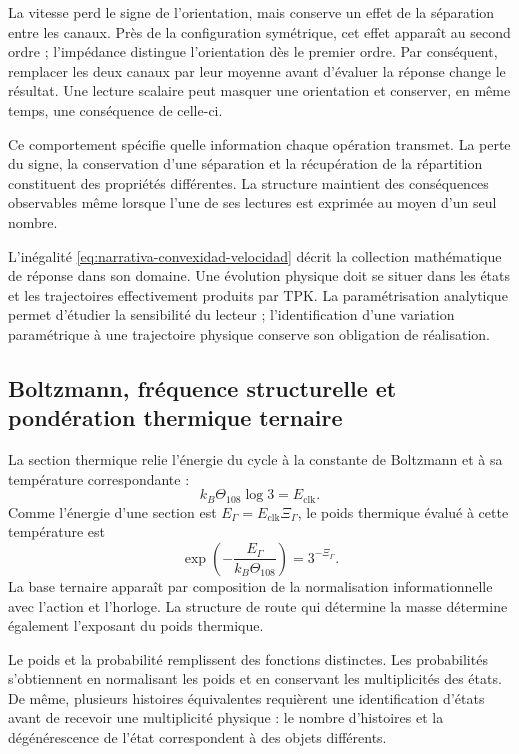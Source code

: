 La vitesse perd le signe de l’orientation, mais conserve un effet
de la séparation entre les canaux. Près de la configuration symétrique,
cet effet apparaît au second ordre ; l’impédance distingue l’orientation
dès le premier ordre. Par conséquent, remplacer les deux canaux par leur moyenne avant
d’évaluer la réponse change le résultat. Une lecture scalaire peut masquer
une orientation et conserver, en même temps, une conséquence de celle-ci.

Ce comportement spécifie quelle information chaque opération transmet.
La perte du signe, la conservation d’une séparation et la récupération
de la répartition constituent des propriétés différentes. La structure maintient
des conséquences observables même lorsque l’une de ses lectures est exprimée
au moyen d’un seul nombre.

L’inégalité \eqref{eq:narrativa-convexidad-velocidad} décrit la collection
mathématique de réponse dans son domaine. Une évolution physique doit se situer
dans les états et les trajectoires effectivement produits par TPK. La
paramétrisation analytique permet d’étudier la sensibilité du lecteur ;
l’identification d’une variation paramétrique à une trajectoire physique
conserve son obligation de réalisation.

\subsection{Boltzmann, fréquence structurelle et pondération thermique ternaire}
\label{subsec:narrativa-boltzmann}

La section thermique relie l’énergie du cycle à la constante de
Boltzmann et à sa température correspondante :
\begin{equation}
 k_B\Theta_{108}\log3=E_{\mathrm{clk}}.
 \label{eq:narrativa-boltzmann-ciclo}
\end{equation}
Comme l’énergie d’une section est
$E_\Gamma=E_{\mathrm{clk}}\Xi_\Gamma$, le poids thermique évalué à cette
température est
\begin{equation}
 \boxed{\exp\!\left(-\frac{E_\Gamma}{k_B\Theta_{108}}\right)
       =3^{-\Xi_\Gamma}.}
 \label{eq:narrativa-peso-termico}
\end{equation}
La base ternaire apparaît par composition de la normalisation informationnelle
avec l’action et l’horloge. La structure de route qui détermine la masse
détermine également l’exposant du poids thermique.

Le poids et la probabilité remplissent des fonctions distinctes. Les probabilités
s’obtiennent en normalisant les poids et en conservant les multiplicités des
états. De même, plusieurs histoires équivalentes requièrent une identification
d’états avant de recevoir une multiplicité physique : le nombre d’histoires
et la dégénérescence de l’état correspondent à des objets différents.

